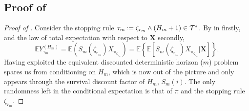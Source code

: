\documentclass[11pt, a4paper, twoside]{article}
\newcommand*{\defeq}{\mathrel{\vcenter{\baselineskip0.5ex \lineskiplimit0pt
			\hbox{\scriptsize.}\hbox{\scriptsize.}}}=}
\newcommand{\ssup}[1]{{\scriptscriptstyle{({#1})}}}
\newcommand{\EE}{\mathbb{E}}
\newcommand{\TT}{\mathcal{T}}
\newcommand{\XX}{\mathbf{X}}
\numberwithin{equation}{section}
\begin{document}
	\subsection{Proof of }\label{supphardsecretaryfuture}
    	\begin{proof}[Proof of ]
		Consider the stopping rule $\tau_m\defeq\zeta_{r_m}\wedge(H_m+1)\in\TT^*$. By  in  firstly, and the law of total expectation with respect to $\XX$ secondly, 
		\begin{equation}\label{expectedreturn}
			\EE Y_{\tau_m}^\ssup{H_m}=\EE\left( S_m(\zeta_{r_m})X_{\pi_{\zeta_{r_m}}}\right)=\EE\left\lbrace\EE\left[S_m(\zeta_{r_m})X_{\pi_{\zeta_{r_m}}}|\XX\right]\right\rbrace.
		\end{equation} 
		Having exploited the equivalent discounted deterministic horizon ($m$) problem spares us from conditioning on $H_m$, which is now out of the picture and only appears through the survival discount factor of $H_m$, $S_m(i)$. The only randomness left in the conditional expectation is that of $\pi$ and the stopping rule $\zeta_{r_m}$.
		

\end{proof}
\end{document}
